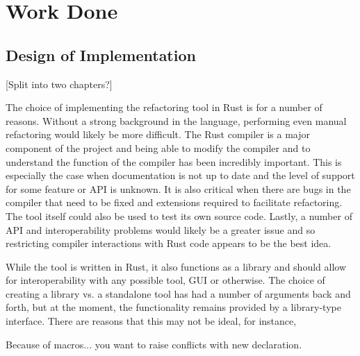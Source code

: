 \chapter{Work Done}\label{C:wd}

\section{Design of Implementation}


[Split into two chapters?]

The choice of implementing the refactoring tool in Rust is for a number of reasons. Without a strong background in the language, performing even manual refactoring would likely be more difficult. The Rust compiler is a major component of the project and being able to modify the compiler and to understand the function of the compiler has been incredibly important. This is especially the case when documentation is not up to date and the level of support for some feature or API is unknown. It is also critical when there are bugs in the compiler that need to be fixed and extensions required to facilitate refactoring. The tool itself could also be used to test its own source code. Lastly, a number of API and interoperability problems would likely be a greater issue and so restricting compiler interactions with Rust code appears to be the best idea. 

While the tool is written in Rust, it also functions as a library and should allow for interoperability with any possible tool, GUI or otherwise. The choice of creating a library vs. a standalone tool has had a number of arguments back and forth, but at the moment, the functionality remains provided by a library-type interface. There are reasons that this may not be ideal, for instance, 


Because of macros... you want to raise conflicts with new declaration.

